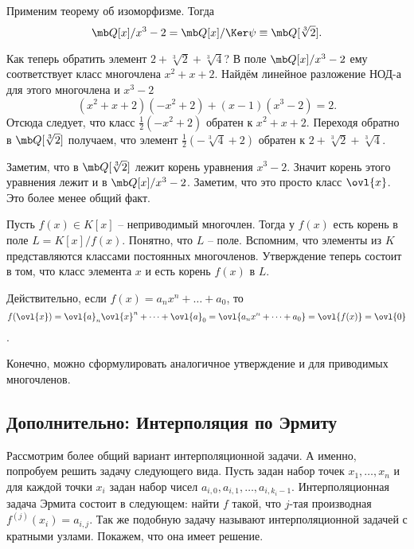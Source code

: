Применим теорему об изоморфизме. Тогда $$\mb Q[x]/x^3-2= \mb Q[x]/\Ker \psi \equiv \mb Q[\sqrt[3]{2}].$$

Как теперь обратить элемент $2+\sqrt[3]{2} + \sqrt[3]{4}$? В поле  $\mb Q[x]/x^3-2$ ему соответствует класс многочлена $x^2+x+2$. Найдём линейное разложение НОД-а для этого многочлена и $x^3-2$ 
$$(x^2+x+2)(-x^2+2)+(x-1)(x^3-2)=2.$$
Отсюда следует, что класс $\frac{1}{2}(-x^2+2)$ обратен к $x^2+x+2$. Переходя обратно в $\mb Q[\sqrt[3]{2}]$ получаем, что элемент $\frac{1}{2}(-\sqrt[3]{4}+2)$ обратен к $2+\sqrt[3]{2} + \sqrt[3]{4}$.

Заметим, что в $\mb Q[\sqrt[3]{2}]$ лежит корень уравнения $x^3-2$. Значит корень этого уравнения лежит и в $\mb Q[x]/x^3-2$. Заметим, что это просто класс $\ovl{x}$. Это более менее общий факт.



 Пусть $f(x)\in K[x]$ -- неприводимый многочлен. Тогда у $f(x)$ есть корень в поле $L=K[x]/f(x)$.
\eutv
\proof Понятно, что $L$ -- поле. Вспомним, что элементы из $K$ представляются классами постоянных многочленов. 
Утверждение теперь состоит в том, что класс элемента $x$ и есть корень $f(x)$ в $L$.

Действительно, если $f(x)=a_nx^n+\dots+a_0$, то $$f(\ovl{x})=\ovl{a}_n\ovl{x}^n+\dots+\ovl{a}_0=\ovl{a_nx^n+\dots+a_0}=\ovl{f(x)}=\ovl{0}$$.
\endproof

\rm Конечно, можно сформулировать аналогичное утверждение и для приводимых многочленов.
\erm






\subsection{Дополнительно: Интерполяция по Эрмиту}

Рассмотрим более общий вариант интерполяционной задачи. А именно, попробуем решить задачу следующего вида.
Пусть задан набор точек $x_1,\dots, x_n$ и для каждой точки $x_i$ задан набор чисел $a_{i,0}, a_{i,1},\dots , a_{i,k_i-1}$. Интерполяционная задача Эрмита состоит в следующем: найти $f$ такой, что $j$-тая производная $f^{(j)}(x_i)=a_{i,j}$. Так же подобную задачу называют интерполяционной задачей с кратными узлами. Покажем, что она имеет решение.



